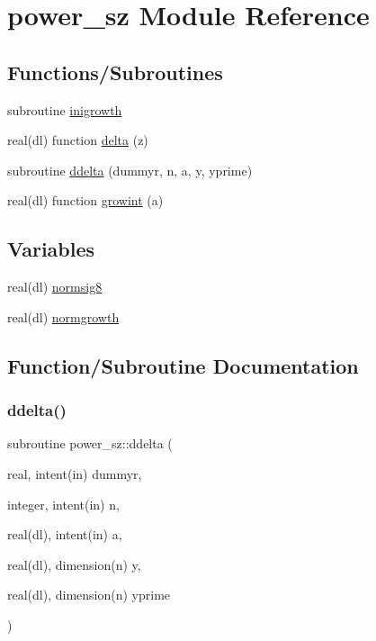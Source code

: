 \hypertarget{namespacepower__sz}{}\section{power\+\_\+sz Module Reference}
\label{namespacepower__sz}
\subsection*{Functions/\+Subroutines}
\begin{DoxyCompactItemize}
\item 
subroutine \mbox{\hyperlink{namespacepower__sz_aba87ceb74647bba3404b96101f438d35}{inigrowth}}
\item 
real(dl) function \mbox{\hyperlink{namespacepower__sz_aa30236046bbf63ea0304f440bef4964d}{delta}} (z)
\item 
subroutine \mbox{\hyperlink{namespacepower__sz_adf64f1eb16e70afa359a6b084d2219d4}{ddelta}} (dummyr, n, a, y, yprime)
\item 
real(dl) function \mbox{\hyperlink{namespacepower__sz_ad0eb7df0cb325285d971ac5aa7c80754}{growint}} (a)
\end{DoxyCompactItemize}
\subsection*{Variables}
\begin{DoxyCompactItemize}
\item 
real(dl) \mbox{\hyperlink{namespacepower__sz_a9c2a55f8b77bacfff31fc7792410a4cc}{normsig8}}
\item 
real(dl) \mbox{\hyperlink{namespacepower__sz_ad00d03b01e9af9747a7013d7ea680a25}{normgrowth}}
\end{DoxyCompactItemize}


\subsection{Function/\+Subroutine Documentation}
\mbox{\label{namespacepower__sz_adf64f1eb16e70afa359a6b084d2219d4}} 
\subsubsection{\texorpdfstring{ddelta()}{ddelta()}}
{\footnotesize\ttfamily subroutine power\+\_\+sz\+::ddelta (\begin{DoxyParamCaption}\item[{real, intent(in)}]{dummyr,  }\item[{integer, intent(in)}]{n,  }\item[{real(dl), intent(in)}]{a,  }\item[{real(dl), dimension(n)}]{y,  }\item[{real(dl), dimension(n)}]{yprime }\end{DoxyParamCaption})}



